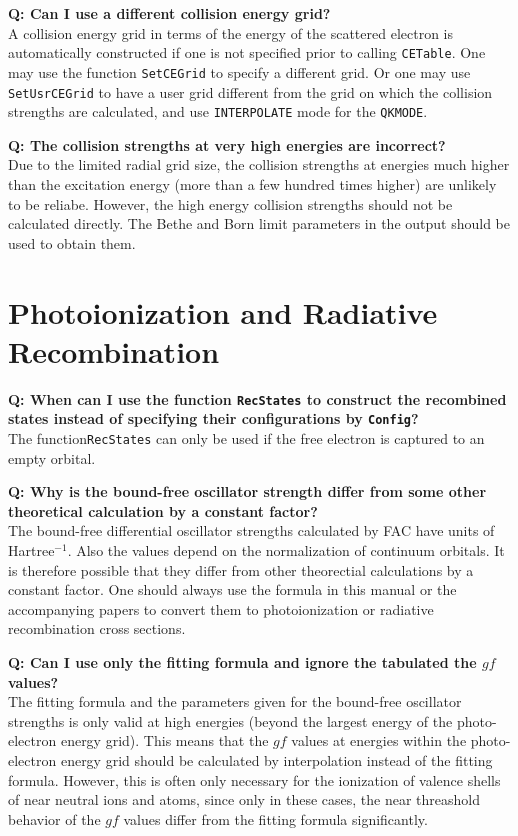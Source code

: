 \documentclass[twoside,letterpaper]{refrep}
\newcommand{\key}[1]{\texttt{#1}}
\newcounter{faq}[section]
\newcommand{\faq}[2]{\stepcounter{faq}
	\begin{minipage}{\textwidth}
	\textbf{Q\arabic{faq}: #1?}\\#2
	\end{minipage}}
\begin{document}
\faq{Can I use a different collision energy grid}{
A collision energy grid in terms of the energy of the scattered electron is
automatically constructed if one is not specified prior to calling
\key{CETable}. One may use the function \key{SetCEGrid} to specify a different
grid. Or one may use \key{SetUsrCEGrid} to have a user grid different from the
grid on which the collision strengths are calculated, and use
\key{INTERPOLATE} mode for the \key{QKMODE}.}

\faq{The collision strengths at very high energies are incorrect}{
Due to the limited radial grid size, the collision strengths at energies much
higher than the excitation energy (more than a few hundred times higher) are
unlikely to be reliabe. However, the high energy collision strengths should
not be calculated directly. The Bethe and Born limit parameters in the output
should be used to obtain them.}

\section{Photoionization and Radiative Recombination}
\faq{When can I use the function \key{RecStates} to construct the
recombined states instead of specifying their configurations by \key{Config}}{
The function\key{RecStates} can only be used if the free electron is captured
to an empty orbital.}

\faq{Why is the bound-free oscillator strength differ from some other
theoretical calculation by a constant factor}{
The bound-free differential oscillator strengths calculated by FAC have units
of Hartree$^{-1}$. Also the values depend on the normalization of continuum
orbitals. It is therefore possible that they differ from other theorectial
calculations by a constant factor. One should always use the formula in this
manual or the accompanying papers to convert them to photoionization or
radiative recombination cross sections.}

\faq{Can I use only the fitting formula and ignore the tabulated the $gf$
values}{
The fitting formula and the parameters given for the bound-free oscillator
strengths is only valid at high energies (beyond the largest energy of the
photo-electron energy grid). This means that the $gf$ values at energies
within the photo-electron energy grid should be calculated by interpolation
instead of the fitting formula. However, this is often only necessary for the
ionization of valence shells of near neutral ions and atoms, since only in
these cases, the near threashold behavior of the $gf$ values differ from the
fitting formula significantly.}
\end{document}
